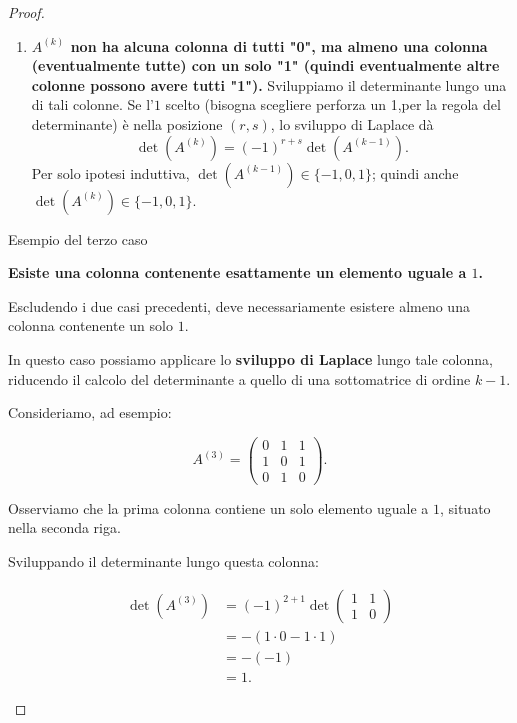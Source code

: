 \begin{proof}
\begin{enumerate}
\item \textbf{$A^{(k)}$ non ha alcuna colonna di tutti "0", ma almeno una colonna (eventualmente tutte) con un solo "1" (quindi eventualmente altre colonne possono avere tutti "1").}
Sviluppiamo il determinante lungo una di tali colonne.
Se l'\(1\) scelto (bisogna scegliere perforza un 1,per la regola del determinante) è nella posizione \((r,s)\), lo sviluppo
di Laplace dà
\[
\det\!\left(A^{(k)}\right)
=(-1)^{r+s}\det\!\left(A^{(k-1)}\right).
\]
Per solo ipotesi induttiva, \(\det\!\left(A^{(k-1)}\right)\in\{-1,0,1\}\); quindi anche
\(\det\!\left(A^{(k)}\right)\in\{-1,0,1\}\).

\end{enumerate}

\begin{example}{Esempio del terzo caso}
    
    \textbf{Esiste una colonna contenente esattamente
    un elemento uguale a $1$.}

    Escludendo i due casi precedenti, deve necessariamente
    esistere almeno una colonna contenente un solo $1$.

    In questo caso possiamo applicare lo
    \textbf{sviluppo di Laplace} lungo tale colonna,
    riducendo il calcolo del determinante a quello
    di una sottomatrice di ordine $k-1$.

    Consideriamo, ad esempio:

    \[
    A^{(3)}=
    \begin{pmatrix}
    0 & 1 & 1\\
    1 & 0 & 1\\
    0 & 1 & 0
    \end{pmatrix}.
    \]

    Osserviamo che la prima colonna contiene
    un solo elemento uguale a $1$, situato
    nella seconda riga.

    Sviluppando il determinante lungo questa colonna:

    \[
    \begin{aligned}
    \det(A^{(3)})
    &=(-1)^{2+1}
    \det
    \begin{pmatrix}
    1 & 1\\
    1 & 0
    \end{pmatrix}\\[6pt]
    &=-\left(1\cdot 0-1\cdot 1\right)\\[6pt]
    &=-(-1)\\[6pt]
    &=1.
    \end{aligned}
    \]


\end{example}
\end{proof}
